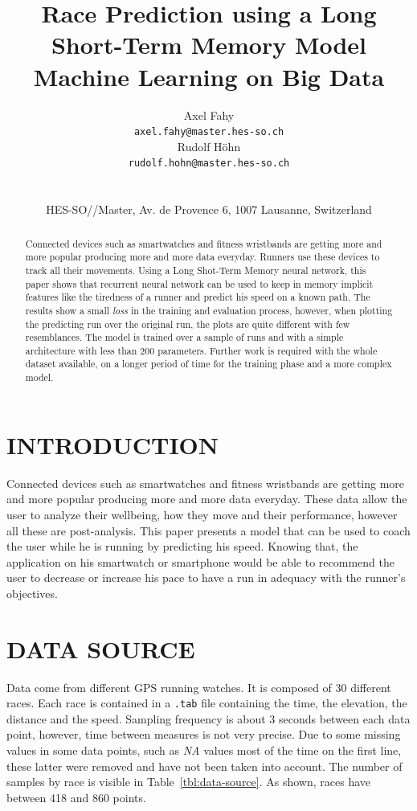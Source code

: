 \documentclass[a4paper, 10pt, conference]{ieeeconf}      %
\title{\LARGE \bf
Race Prediction using a Long Short-Term Memory Model\\
\vspace*{0.05 in}
\small{Machine Learning on Big Data}
}
\author{ \parbox{3 in}{\centering Axel Fahy\\
         {\tt\small axel.fahy@master.hes-so.ch}}
         \hspace*{ 0.5 in}
		 \parbox{3 in}{\centering Rudolf Höhn\\
         {\tt\small rudolf.hohn@master.hes-so.ch}}
         \\\\
         \centering
         HES-SO//Master, Av. de Provence 6, 1007 Lausanne, Switzerland
}
\begin{document}
\maketitle
\thispagestyle{empty}
\pagestyle{empty}

\begin{abstract}
Connected devices such as smartwatches and fitness wristbands are getting more and more popular producing more and more data everyday. Runners use these devices to track all their movements. Using a Long Shot-Term Memory neural network, this paper shows that recurrent neural network can be used to keep in memory implicit features like the tiredness of a runner and predict his speed on a known path. The results show a small \textit{loss} in the training and evaluation process, however, when plotting the predicting run over the original run, the plots are quite different with few resemblances. The model is trained over a sample of runs and with a simple architecture with less than 200 parameters. Further work is required with the whole dataset available, on a longer period of time for the training phase and a more complex model.

\end{abstract}

\section{INTRODUCTION}
Connected devices such as smartwatches and fitness wristbands are getting more and more popular producing more and more data everyday. These data allow the user to analyze their wellbeing, how they move and their performance, however all these are post-analysis. This paper presents a model that can be used to coach the user while he is running by predicting his speed. Knowing that, the application on his smartwatch or smartphone would be able to recommend the user to decrease or increase his pace to have a run in adequacy with the runner's objectives.

\section{DATA SOURCE}

Data come from different GPS running watches. It is composed of 30 different races. Each race is contained in a \texttt{.tab} file containing the time, the elevation, the distance and the speed. Sampling frequency is about 3 seconds between each data point, however, time between measures is not very precise. Due to some missing values in some data points, such as \textit{NA} values most of the time on the first line, these latter were removed and have not been taken into account. The number of samples by race is visible in Table~\ref{tbl:data-source}. As shown, races have between 418 and 860 points.
\end{document}
